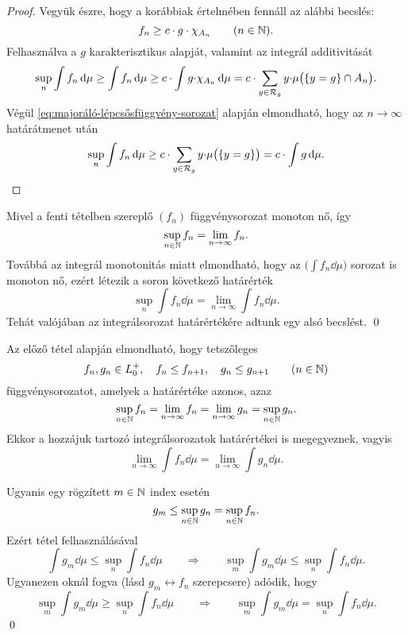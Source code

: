 \documentclass[
]{elteikthesis}[2024/04/26]
\begin{document}
\begin{proof}
		Vegyük észre, hogy a korábbiak értelmében fennáll az alábbi becslés:
		\[
			f_n \geq c \cdot g \cdot \chi_{A_n} \qquad (n \in \mathbb{N}).
		\]
		Felhasználva a \( g \) karakterisztikus alapját, 
		valamint az integrál additivitását
		\[
			\sup_{n} \int f_n \mathop{}\!\mathrm{d}{\mu} \geq
			\int f_n \mathop{}\!\mathrm{d}{\mu} \geq 
			c \cdot \int g {\cdot} \chi_{A_n} \mathop{}\!\mathrm{d}{\mu} = 
			c \cdot \sum_{y \in \mathcal{R}_{g}} y {\cdot} \mu\bigl( \{ y = g \} \cap A_n \bigr).
		\]
		Végül \eqref{eq:majoráló-lépcsősfüggvény-sorozat} alapján elmondható, 
		hogy az \( n \to \infty \) határátmenet után
		\[
			\sup_{n} \int f_n \mathop{}\!\mathrm{d}{\mu} \geq 
			c \cdot \sum_{y \in \mathcal{R}_{g}} y {\cdot} \mu\bigl( \{ y = g \} \bigr) =
			c \cdot \int g \mathop{}\!\mathrm{d}{\mu}.
		\]
	\end{proof}
	\newpage
	\begin{note}
		Mivel a fenti tételben szereplő \( (f_n) \) függvénysorozat monoton nő, így
		\[
			\sup_{n \in \mathbb{N}} f_n = \lim_{n \to \infty} f_n.
		\]
		Továbbá az integrál monotonitás miatt elmondható, 
		hogy az \( \bigl( \int f_n \dd{\mu} \bigr) \) sorozat is monoton nő,
		ezért létezik a soron következő határérték
		\[
			\sup_{n} \int f_n \dd{\mu} = 
			\lim_{n \to \infty} \int f_n \dd{\mu}.
		\]
		Tehát valójában az integrálsorozat határértékére adtunk egy alsó becslést. \qed 
	\end{note}
	
	\begin{theo*}
		Az előző tétel alapján elmondható, hogy tetszőleges
		\[
			f_n, g_n \in \StepFuncPos, \quad 
			f_n \leq f_{n + 1}, \quad 
			g_n \leq g_{n + 1} \qquad (n \in \N)
		\]
		függvénysorozatot, amelyek a határértéke azonos, azaz
		\[
			\sup_{n \in \mathbb{N}} f_n = 
			\lim_{n \to \infty} f_n = 
			\lim_{n \to \infty} g_n = 
			\sup_{n \in \mathbb{N}} g_n.
		\]
		Ekkor a hozzájuk tartozó integrálsorozatok határértékei is megegyeznek, vagyis
		\[
			\lim_{n \to \infty} \int f_n \dd{\mu} = 
			\lim_{n \to \infty} \int g_n \dd{\mu}.
		\]
	\end{theo*}
	\begin{proof*}
		Ugyanis egy rögzített \( m \in \mathbb{N} \) index esetén
		\[
			g_m \leq \sup_{n \in \mathbb{N}} g_n = \sup_{n \in \mathbb{N}} f_n.
		\]
		Ezért  tétel felhasználásával
		\[
			\int g_m \dd{\mu} \leq \sup_{n} \int f_n \dd{\mu}
			\qquad \Longrightarrow \qquad
			\sup_{m} \int g_m \dd{\mu} \leq \sup_{n} \int f_n \dd{\mu}.
		\]
		Ugyanezen oknál fogva (lásd \( g_m \longleftrightarrow f_n \) szerepcsere) adódik, hogy
		\[
			\sup_{m} \int g_m \dd{\mu} \geq \sup_{n} \int f_n \dd{\mu}
			\qquad \Longrightarrow \qquad
			\boxed{\sup_{m} \int g_m \dd{\mu} = \sup_{n} \int f_n \dd{\mu}}.
		\]
		\qed
	\end{proof*}
	
\end{document}
